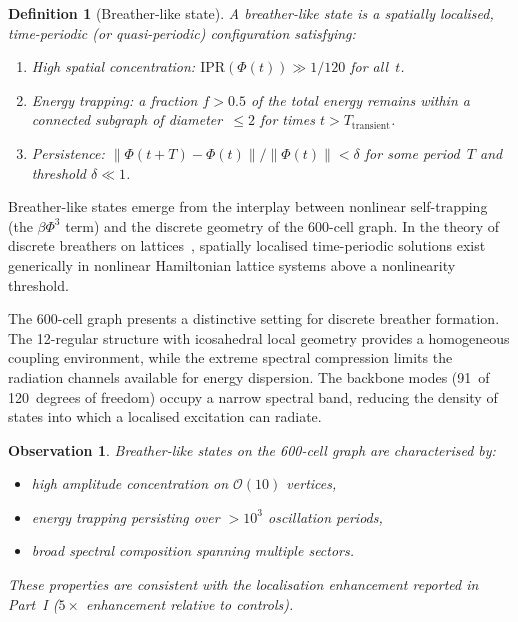 \documentclass[12pt,a4paper]{article}
\newtheorem{definition}{Definition}
\newtheorem{observation}{Observation}
\begin{document}
\begin{definition}[Breather-like state]
A breather-like state is a spatially localised, time-periodic (or
quasi-periodic) configuration satisfying:
\begin{enumerate}[nosep]
  \item High spatial concentration:
    $\mathrm{IPR}(\Phi(t)) \gg 1/120$ for all~$t$.
  \item Energy trapping: a fraction $f > 0.5$ of the total energy
    remains within a connected subgraph of diameter~$\leq 2$ for
    times $t > T_{\mathrm{transient}}$.
  \item Persistence: $\lVert \Phi(t+T) - \Phi(t) \rVert / \lVert
    \Phi(t) \rVert < \delta$ for some period~$T$ and threshold
    $\delta \ll 1$.
\end{enumerate}
\end{definition}

Breather-like states emerge from the interplay between nonlinear
self-trapping (the $\beta \Phi^3$ term) and the discrete geometry of
the 600-cell graph.  In the theory of discrete breathers on
lattices~\cite{flach2008,aubry1997}, spatially localised time-periodic
solutions exist generically in nonlinear Hamiltonian lattice systems
above a nonlinearity threshold.

The 600-cell graph presents a distinctive setting for discrete breather
formation.  The 12-regular structure with icosahedral local geometry
provides a homogeneous coupling environment, while the extreme
spectral compression limits the radiation channels available for
energy dispersion.  The backbone modes (91~of 120~degrees of freedom)
occupy a narrow spectral band, reducing the density of states into
which a localised excitation can radiate.

\begin{observation}
Breather-like states on the 600-cell graph are characterised by:
\begin{itemize}[nosep]
  \item high amplitude concentration on $\mathcal{O}(10)$ vertices,
  \item energy trapping persisting over $> 10^3$ oscillation periods,
  \item broad spectral composition spanning multiple sectors.
\end{itemize}
These properties are consistent with the localisation enhancement
reported in Part~I ($5\times$ enhancement relative to controls).
\end{observation}
\end{document}
